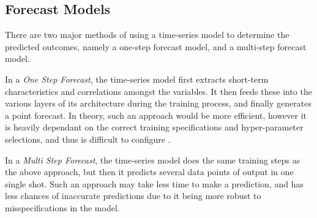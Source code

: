 \subsection{Forecast Models}
\label{subsec:ch2-time-series-forecast-models}

There are two major methods of using a time-series model to determine the predicted outcomes, namely a one-step forecast model, and a multi-step forecast model.\par

In a \textit{One Step Forecast}, the time-series model first extracts short-term characteristics and correlations amongst the variables. It then feeds these into the various layers of its architecture during the training process, and finally generates a point forecast. In theory, such an approach would be more efficient, however it is heavily dependant on the correct training specifications and hyper-parameter selections, and thus is difficult to configure \cite{marcellino2006comparison}.\par

In a \textit{Multi Step Forecast}, the time-series model does the same training steps as the above approach, but then it predicts several data points of output in one single shot. Such an approach may take less time to make a prediction, and has less chances of inaccurate predictions due to it being more robust to misspecifications in the model.
